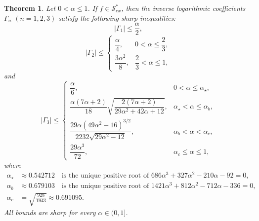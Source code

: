 \documentclass[11pt,reqno]{amsart}
\newtheorem{theo}{Theorem}[section]
\numberwithin{equation}{section}
\begin{document}
\begin{theo}\label{T1}
Let $0<\alpha\le 1$. If $f\in \mathcal{S}_{ex}^{\ast}$, then the inverse logarithmic coefficients $\Gamma_n$ $(n=1,2,3)$ satisfy the following sharp inequalities:
\[
|\Gamma_1|\le \frac{\alpha}{2},
\]
\[
|\Gamma_2|\le
\begin{cases}
\dfrac{\alpha}{4}, & 0<\alpha\le \dfrac23,\\[6pt]
\dfrac{3\alpha^2}{8}, & \dfrac23<\alpha\le1,
\end{cases}
\]
and
\begin{equation}\label{ND3}
|\Gamma_3|\le 
\begin{cases}
\dfrac{\alpha}{6}, & 0<\alpha\le \alpha_\star,\\[8pt]
\dfrac{\alpha(7\alpha+2)}{18}
\sqrt{\dfrac{2(7\alpha+2)}{29\alpha^2+42\alpha+12}},
& \alpha_\star<\alpha\le \alpha_b,\\[8pt]
\dfrac{29\alpha(49\alpha^2-16)^{3/2}}
{2232\sqrt{29\alpha^2-12}},
& \alpha_b<\alpha<\alpha_c,\\[8pt]
\dfrac{29\alpha^3}{72}, & \alpha_c\le \alpha\le 1,
\end{cases}
\end{equation}
where
\[
\begin{aligned}
\alpha_\star &\approx 0.542712
\quad \text{is the unique positive root of } 686\alpha^3+327\alpha^2-210\alpha-92=0,\\[2mm]
\alpha_b &\approx 0.679103
\quad \text{is the unique positive root of } 1421\alpha^3+812\alpha^2-712\alpha-336=0,\\[2mm]
\alpha_c &=\sqrt{\frac{928}{1943}}\approx 0.691095.
\end{aligned}
\]
All bounds are sharp for every $\alpha\in(0,1]$.
\end{theo}
\end{document}
